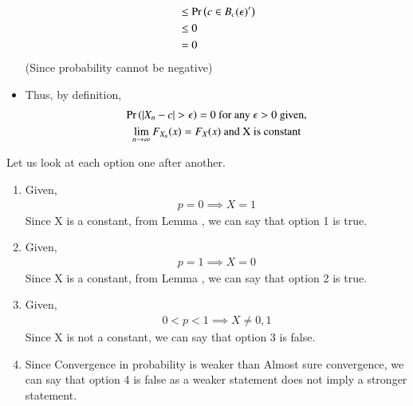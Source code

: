 \documentclass[journal,12pt,twocolumn]{IEEEtran}
\begin{document}
\begin{itemize}
\begin{align}
            &\leq \Pr\left(c \in B_c( \epsilon )^\prime\right) \\
            &\leq 0 \\
            &= 0 
        \end{align}
        (Since probability cannot be negative)
        \item Thus, by definition,
        \begin{multline}
             \pr{|X_n-c|> \epsilon} = 0 \text{ for any }\epsilon > 0 \text{ given,} \\    
            \lim_{n \rightarrow \infty} F_{X_n}(x) = F_X(x)\text{ and X is constant}
        \end{multline}
    \end{itemize}

Let us look at each option one after another.
\begin{enumerate}
    \item Given,
    \begin{align}\nonumber
        p = 0 \implies X = 1
    \end{align}
    Since X is a constant, from Lemma , we can say that option 1 is true.
    \item Given,
      \begin{align}\nonumber
        p = 1 \implies X = 0
    \end{align}
    Since X is a constant, from Lemma , we can say that option 2 is true.
    \item Given,
      \begin{align}\nonumber
        0 < p < 1 \implies X \neq 0,1
    \end{align}
    Since X is not a constant, we can say that option 3 is false.
    \item Since Convergence in probability is weaker than Almost sure convergence, we can say that option 4 is false as a weaker statement does not imply a stronger statement.
\end{enumerate}
\end{document}
